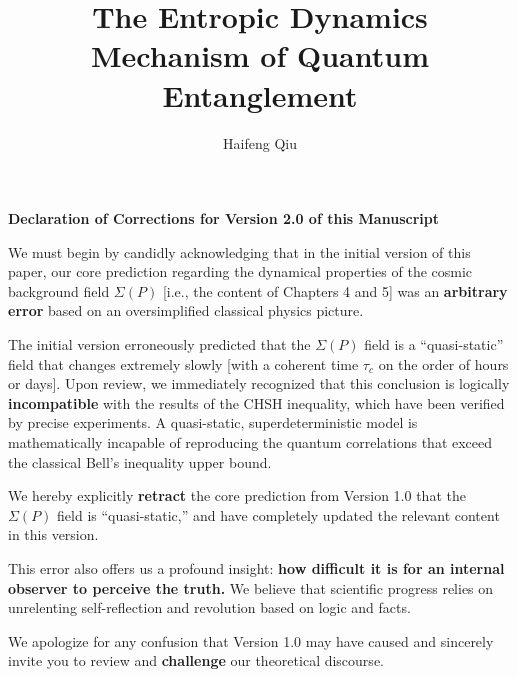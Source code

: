 \documentclass[11pt]{article}
\title{\textbf{The Entropic Dynamics Mechanism of Quantum Entanglement}}
\author{Haifeng Qiu}
\begin{document}
\begin{titlepage}
\thispagestyle{empty} %
\begin{center}
\vspace{4mm}
\textbf{Declaration of Corrections for Version 2.0 of this Manuscript}
\vspace{4mm}
\end{center}

We must begin by candidly acknowledging that in the initial version of this paper, our core prediction regarding the dynamical properties of the cosmic background field $\Sigma(P)$ [i.e., the content of Chapters 4 and 5] was an \textbf{arbitrary error} based on an oversimplified classical physics picture.

The initial version erroneously predicted that the $\Sigma(P)$ field is a ``quasi-static'' field that changes extremely slowly [with a coherent time $\tau_c$ on the order of hours or days]. Upon review, we immediately recognized that this conclusion is logically \textbf{incompatible} with the results of the CHSH inequality, which have been verified by precise experiments. A quasi-static, superdeterministic model is mathematically incapable of reproducing the quantum correlations that exceed the classical Bell's inequality upper bound.

We hereby explicitly \textbf{retract} the core prediction from Version 1.0 that the $\Sigma(P)$ field is ``quasi-static,'' and have completely updated the relevant content in this version.

This error also offers us a profound insight: \textbf{how difficult it is for an internal observer to perceive the truth.} We believe that scientific progress relies on unrelenting self-reflection and revolution based on logic and facts.

\vspace{1cm}

We apologize for any confusion that Version 1.0 may have caused and sincerely invite you to review and \textbf{challenge} our theoretical discourse.
\vspace*{\fill}
\end{titlepage}

\clearpage


\maketitle
\thispagestyle{empty} %
\newpage
\setcounter{page}{1}
\end{document}

